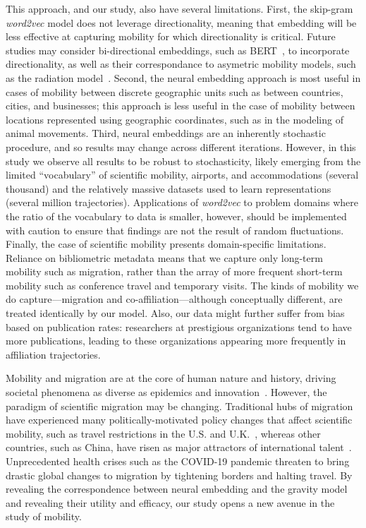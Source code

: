 \documentclass[12pt]{article} %
\begin{document}
This approach, and our study, also have several limitations.
First, the skip-gram \textit{word2vec} model does not leverage directionality, meaning that embedding will be less effective at capturing mobility for which directionality is critical.
Future studies may consider bi-directional embeddings, such as BERT~\autocite{devlin2018bert}, to incorporate directionality, as well as their correspondance to asymetric mobility models, such as the radiation model~\cite{simini2012universal}.
Second, the neural embedding approach is most useful in cases of mobility between discrete geographic units such as between countries, cities, and businesses; this approach is less useful in the case of mobility between locations represented using geographic coordinates, such as in the modeling of animal movements.
Third, neural embeddings are an inherently stochastic procedure, and so results may change across different iterations.
However, in this study we observe all results to be robust to stochasticity, likely emerging from the limited ``vocabulary'' of scientific mobility, airports, and accommodations (several thousand) and the relatively massive datasets used to learn representations (several million trajectories).
Applications of \textit{word2vec} to problem domains where the ratio of the vocabulary to data is smaller, however, should be implemented with caution to ensure that findings are not the result of random fluctuations.
Finally, the case of scientific mobility presents domain-specific limitations.
Reliance on bibliometric metadata means that we capture only long-term mobility such as migration, rather than the array of more frequent short-term mobility such as conference travel and temporary visits.
The kinds of mobility we do capture---migration and co-affiliation---although conceptually different, are treated identically by our model.
Also, our data might further suffer from bias based on publication rates: researchers at prestigious organizations tend to have more publications, leading to these organizations appearing more frequently in affiliation trajectories.


Mobility and migration are at the core of human nature and history, driving societal phenomena as diverse as epidemics\autocite{kraemer2020covid, truscott2012epidemicgravity} and innovation~\autocite{kaiser2018innovation, sugimoto2017mostimpact, petersen2018multiscale, morgan2018prestige, rodrigues2016mobility}.
However, the paradigm of scientific migration may be changing.
Traditional hubs of migration have experienced many politically-motivated policy changes that affect scientific mobility, such as travel restrictions in the U.S. and U.K.~\autocite{chinchilla2018travelban}, whereas other countries, such as China, have risen as major attractors of international talent~\autocite{cao2020returning}.
Unprecedented health crises such as the COVID-19 pandemic threaten to bring drastic global changes to migration by tightening borders and halting travel.
By revealing the correspondence between neural embedding and the gravity model and revealing their utility and efficacy, our study opens a new avenue in the study of mobility.
\end{document}
